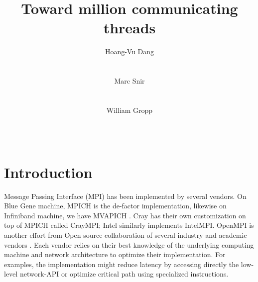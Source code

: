 \documentclass{sig-alternate-05-2015}
\begin{document}




\title{Toward million communicating threads}

\author{
\alignauthor
Hoang-Vu Dang\\
\\
\\
%
\alignauthor
Marc Snir\\
\\
\\
%
\alignauthor
William Gropp\\
\\
\\
}

\maketitle


\section{Introduction}
Message Passing Interface (MPI) has been implemented by several vendors. On
Blue Gene machine, MPICH \cite{mpich} is the de-factor implementation, likewise
on Infiniband machine, we have MVAPICH \cite{mvapich}. Cray has their own
customization on top of MPICH called CrayMPI; Intel similarly implements
IntelMPI. OpenMPI is another effort from Open-source collaboration of several
industry and academic vendors \cite{openMPI}.  Each vendor relies on 
their best knowledge of the underlying computing machine and network
architecture to optimize their implementation. For examples, the implementation
might reduce latency by accessing directly the low-level network-API or
optimize critical path using specialized instructions.
\end{document}
